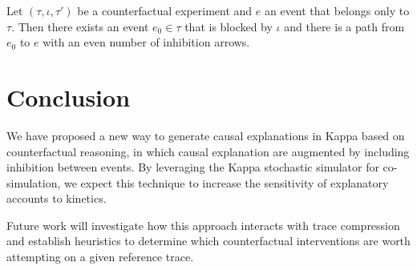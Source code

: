\begin{theorem} Let $(\tau, \iota, \tau')$ be a counterfactual
  experiment and $e$ an event that belongs only to $\tau$. Then there
  exists an event $e_0 \in \tau$ that is blocked by $\iota$ and there
  is a path from $e_0$ to $e$ with an even number of inhibition
  arrows.
\end{theorem}

\section*{Conclusion}

We have proposed a new way to generate causal explanations in Kappa
based on counterfactual reasoning, in which causal explanation are
augmented by including inhibition between events. By leveraging the
Kappa stochastic simulator for co-simulation, we expect this technique
to increase the sensitivity of explanatory accounts to kinetics.

Future work will investigate how this approach interacts with trace
compression \cite{DBLP:conf/fsttcs/DanosFFHH12} and establish
heuristics to determine which counterfactual interventions are worth
attempting on a given reference trace.
